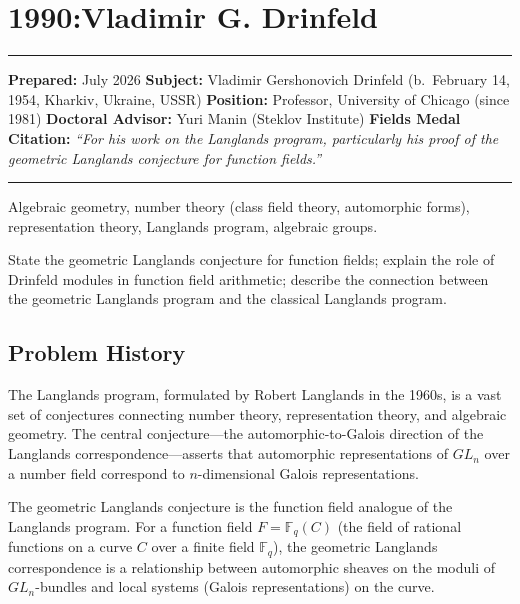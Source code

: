 \chapter{1990:Vladimir G. Drinfeld}\label{ch1990vladimirdrinfeld:vladimir-g.-drinfeld-fields-medal-1990-a-comprehensive-report}

\begin{center}\rule{0.5\linewidth}{0.5pt}\end{center}

\textbf{Prepared:} July 2026 \textbf{Subject:} Vladimir Gershonovich Drinfeld (b.~February 14, 1954, Kharkiv, Ukraine, USSR) \textbf{Position:} Professor, University of Chicago (since 1981) \textbf{Doctoral Advisor:} Yuri Manin (Steklov Institute) \textbf{Fields Medal Citation:} \emph{``For his work on the Langlands program, particularly his proof of the geometric Langlands conjecture for function fields.''}

\begin{center}\rule{0.5\linewidth}{0.5pt}\end{center}

\begin{prereqs} Algebraic geometry, number theory (class field theory, automorphic forms), representation theory, Langlands program, algebraic groups. \end{prereqs}

\begin{objectives} State the geometric Langlands conjecture for function fields; explain the role of Drinfeld modules in function field arithmetic; describe the connection between the geometric Langlands program and the classical Langlands program. \end{objectives}

\section{Problem History}

The Langlands program, formulated by Robert Langlands in the 1960s, is a vast set of conjectures connecting number theory, representation theory, and algebraic geometry. The central conjecture---the automorphic-to-Galois direction of the Langlands correspondence---asserts that automorphic representations of $GL_n$ over a number field correspond to $n$-dimensional Galois representations.

The geometric Langlands conjecture is the function field analogue of the Langlands program. For a function field $F = \mathbb{F}_q(C)$ (the field of rational functions on a curve $C$ over a finite field $\mathbb{F}_q$), the geometric Langlands correspondence is a relationship between automorphic sheaves on the moduli of $GL_n$-bundles and local systems (Galois representations) on the curve.

